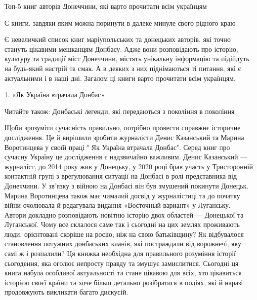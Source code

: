  
 
 
 
 

Топ-5 книг авторів Донеччини, які варто прочитати всім українцям

Є книги, завдяки яким можна поринути в далеке минуле свого рідного краю

Є невеличкий список книг маріупольських та донецьких авторів, які точно стануть
цікавими мешканцям Донбасу. Адже вони розповідають про історію, культуру та
традиції міст Донеччини, містять унікальну інформацію та підійдуть на будь-який
настрій та смак. А в деяких з них піднімаються ті питання, які є актуальними і
в наші дні. Загалом ці книги варто прочитати всім українцям.

1. «Як Україна втрачала Донбас»

Читайте також: Донбаські легенди, які передаються з покоління в покоління

Щоби зрозуміти сучасність правильно, потрібно провести справжнє історичне
дослідження. Це й вирішили зробити журналісти Денис Казанський та Марина
Воротинцева у своїй праці " Як Україна втрачала Донбас". Серед книг про сучасну
Україну це дослідження є надзвичайно важливим. Денис Казанський — журналіст, до
2014 року жив у Донецьку, у 2020 році брав участь у Тристоронній контактній
групі з врегулювання ситуації на Донбасі в ролі представника від Донеччини. У
зв’язку з війною на Донбасі він був змушений покинути Донецьк. Марина
Воротинцева також має чималий досвід у журналістиці та до початку війни
очолювала й редагувала видання «Восточный вариант» у Луганську. Автори докладно
розповідають новітню історію двох областей — Донецької та Луганської. Чому все
склалося саме так і сьогодні на цих землях проживають люди, орієнтовані скоріше
на росію, ніж на свою батьківщину? Як відбувалося становлення потужних
донбаських кланів, які постраждали від ворожнечі, яку самі ж і розпалили? Ця
книжка необхідна для правильного розуміння історії сьогодення, яка оголює
непросту правду та змушує замислитися. Сьогодні ця книга набула особливої
актуальності та стане цікавою для всіх, хто цікавиться історією своєї країни та
хоче більш детально розібратися в подіях, які й наразі продовжують викликати
багато дискусій.

